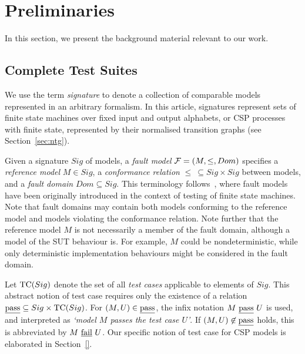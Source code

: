 \section{Preliminaries}
\label{section:preliminaries}

In this section, we present the background material relevant to our work.

\subsection{Complete Test Suites}
\label{sec:fsmfm}

We use the term \emph{signature} to denote a collection of comparable models
represented in an arbitrary formalism. In this article, signatures represent
sets of finite state machines over fixed input and output alphabets, or CSP
processes with finite state, represented by their normalised transition
graphs (see Section~\ref{sec:ntg}).

Given a signature $Sig$  of models, a  \emph{fault model} ${\cal F} =
(M,\le,Dom)$ specifies a \emph{reference model} $M\in Sig$, a
\emph{conformance relation} $\le\ \subseteq Sig\times Sig$ between models,
and a \emph{fault domain} $Dom\subseteq Sig$. This terminology
follows~\cite{gotzhein_fault_1996}, where fault models have been originally
introduced in the context of testing of finite state machines. Note that
fault domains may contain both models conforming to the reference model and
models violating the conformance relation. Note further that the reference
model $M$ is not necessarily a member of the fault domain, although a model
of the SUT behaviour is. For example, $M$ could be nondeterministic, while
only deterministic implementation behaviours might be considered in the fault
domain.

Let ${\text{TC}}(Sig)$ denote the set of all \emph{test cases} applicable to elements
of $Sig$. This abstract notion of test case requires only the existence of a
relation $\underline{\text{pass}}\subseteq Sig\times {\text{TC}}(Sig)$. For $(M,U)\in\underline{\text{pass}}$, the infix
notation $M\ \underline{\text{pass}}\ U$ is used, and interpreted as {\it `model $M$ passes the
test case $U$'}. If $(M,U)\not\in\underline{\text{pass}}$ holds, this is abbreviated by $M\
\underline{\text{fail}}\ U$. Our specific notion of test case for CSP models is elaborated in
Section~\ref{}. \fxwarning{alcc: TBD}

